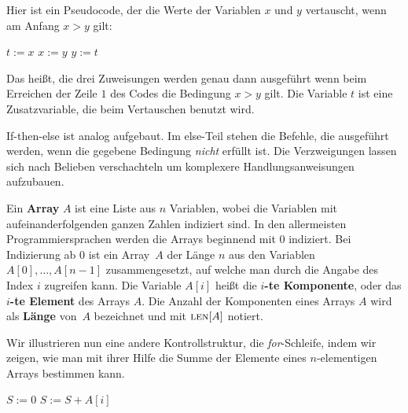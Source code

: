 \begin{bsp} 
Hier ist ein Pseudocode, der die Werte der Variablen $x$ und $y$ vertauscht, wenn am Anfang $x>y$ gilt: 
\begin{center}
	\begin{algorithmic}[1]
		\STATE $t:=x$
		\STATE $x:=y$
		\STATE $y:=t$
		\ENDIF
	\end{algorithmic}
\end{center}
Das heißt, die drei Zuweisungen werden genau dann ausgeführt wenn beim Erreichen der Zeile $1$ des Codes die Bedingung $x>y$ gilt. Die Variable $t$ ist eine Zusatzvariable, die beim Vertauschen benutzt wird. 

If-then-else ist analog aufgebaut. Im else-Teil stehen die Befehle, die ausgeführt werden, wenn die gegebene Bedingung \emph{nicht} erfüllt ist. 
Die Verzweigungen lassen sich nach Belieben verschachteln um komplexere Handlungsanweisungen aufzubauen.
\end{bsp} 

\begin{defn} 
Ein \textbf{Array} $A$ ist eine Liste aus $n$ Variablen, wobei die Variablen mit aufeinanderfolgenden ganzen Zahlen indiziert sind. In den allermeisten Programmiersprachen werden die Arrays beginnend mit $0$ indiziert. Bei Indizierung ab $0$ ist ein Array~$A$ der Länge $n$ aus den Variablen $A[0],\ldots,A[n-1]$ zusammengesetzt, auf welche man durch die Angabe des Index $i$ zugreifen kann. Die Variable $A[i]$ heißt die \textbf{$i$-te Komponente}, oder das \textbf{$i$-te Element} des Arrays $A$. Die Anzahl der Komponenten eines Arrays $A$ wird als \textbf{Länge} von~$A$ bezeichnet und mit $\mathop{\text{\textsc{len}}}[A]$ notiert.
\end{defn} 

\begin{bsp} 
Wir illustrieren nun eine andere Kontrollstruktur, die \emph{for}-Schleife, indem wir zeigen, wie man mit ihrer Hilfe die Summe der Elemente eines $n$-elementigen Arrays bestimmen kann. 

\begin{center}
	\begin{algorithmic}[1]
		\STATE $S:=0$
		\STATE $S:=S+A[i]$
		\ENDFOR
	\end{algorithmic}
\end{center}
\end{bsp} 


